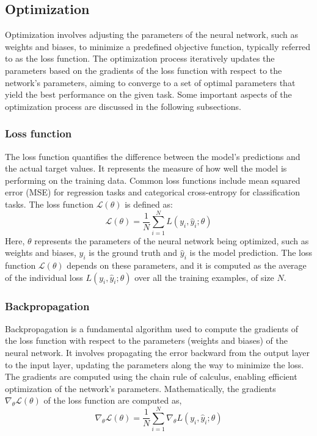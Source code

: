 \subsection{Optimization} 
Optimization involves adjusting the parameters of the neural network, such as weights and biases, to minimize a predefined objective function, typically referred to as the loss function. The optimization process iteratively updates the parameters based on the gradients of the loss function with respect to the network's parameters, aiming to converge to a set of optimal parameters that yield the best performance on the given task. Some important aspects of the optimization process are discussed in the following subsections. 
\subsubsection{Loss function}
The loss function quantifies the difference between the model's predictions and the actual target values. It represents the measure of how well the model is performing on the training data. Common loss functions include mean squared error (MSE) for regression tasks and categorical cross-entropy for classification tasks. The loss function $\mathcal{L}(\theta)$ is defined as: 
\begin{equation}
    \mathcal{L}(\theta)=\frac{1}{N} \sum_{i=1}^N L\left(y_i, \hat{y}_i ; \theta\right)
    \end{equation}
Here, $\theta$ represents the parameters of the neural network being optimized, such as weights and biases, $y_i$ is the ground truth and $\hat{y}_i $ is the model prediction. The loss function $\mathcal{L}(\theta)$ depends on these parameters, and it is computed as the average of the individual loss $L\left(y_i, \hat{y}_i ; \theta\right)$ over all the training examples, of size $N$.
\subsubsection{Backpropagation}
Backpropagation is a fundamental algorithm used to compute the gradients of the loss function with respect to the parameters (weights and biases) of the neural network. It involves propagating the error backward from the output layer to the input layer, updating the parameters along the way to minimize the loss. The gradients are computed using the chain rule of calculus, enabling efficient optimization of the network's parameters. Mathematically, the gradients $\nabla_\theta \mathcal{L}(\theta)$ of the loss function are computed as,
\begin{equation}
    \nabla_\theta \mathcal{L}(\theta)=\frac{1}{N} \sum_{i=1}^N \nabla_\theta L\left(y_i, \hat{y}_i ; \theta\right)
    \end{equation}
